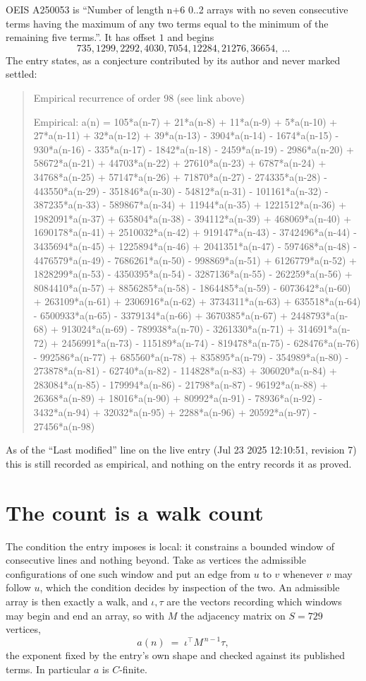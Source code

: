 \documentclass[11pt,a4paper]{article}
\theoremstyle{plain}
\theoremstyle{definition}
\begin{document}
OEIS A250053 is ``Number of length n+6 0..2 arrays with no seven consecutive terms having the maximum of any two terms equal to the minimum of the remaining five terms.''. It has offset $1$ and begins
\[
735, 1299, 2292, 4030, 7054, 12284, 21276, 36654,\ \dots
\]
The entry states, as a conjecture contributed by its author and never marked settled:
\begin{quote}\raggedright\small
Empirical recurrence of order 98 (see link above)

Empirical: a(n) = 105*a(n-7) + 21*a(n-8) + 11*a(n-9) + 5*a(n-10) + 27*a(n-11) + 32*a(n-12) + 39*a(n-13) - 3904*a(n-14) - 1674*a(n-15) - 930*a(n-16) - 335*a(n-17) - 1842*a(n-18) - 2459*a(n-19) - 2986*a(n-20) + 58672*a(n-21) + 44703*a(n-22) + 27610*a(n-23) + 6787*a(n-24) + 34768*a(n-25) + 57147*a(n-26) + 71870*a(n-27) - 274335*a(n-28) - 443550*a(n-29) - 351846*a(n-30) - 54812*a(n-31) - 101161*a(n-32) - 387235*a(n-33) - 589867*a(n-34) + 11944*a(n-35) + 1221512*a(n-36) + 1982091*a(n-37) + 635804*a(n-38) - 394112*a(n-39) + 468069*a(n-40) + 1690178*a(n-41) + 2510032*a(n-42) + 919147*a(n-43) - 3742496*a(n-44) - 3435694*a(n-45) + 1225894*a(n-46) + 2041351*a(n-47) - 597468*a(n-48) - 4476579*a(n-49) - 7686261*a(n-50) - 998869*a(n-51) + 6126779*a(n-52) + 1828299*a(n-53) - 4350395*a(n-54) - 3287136*a(n-55) - 262259*a(n-56) + 8084410*a(n-57) + 8856285*a(n-58) - 1864485*a(n-59) - 6073642*a(n-60) + 263109*a(n-61) + 2306916*a(n-62) + 3734311*a(n-63) + 635518*a(n-64) - 6500933*a(n-65) - 3379134*a(n-66) + 3670385*a(n-67) + 2448793*a(n-68) + 913024*a(n-69) - 789938*a(n-70) - 3261330*a(n-71) + 314691*a(n-72) + 2456991*a(n-73) - 115189*a(n-74) - 819478*a(n-75) - 628476*a(n-76) - 992586*a(n-77) + 685560*a(n-78) + 835895*a(n-79) - 354989*a(n-80) - 273878*a(n-81) - 62740*a(n-82) - 114828*a(n-83) + 306020*a(n-84) + 283084*a(n-85) - 179994*a(n-86) - 21798*a(n-87) - 96192*a(n-88) + 26368*a(n-89) + 18016*a(n-90) + 80992*a(n-91) - 78936*a(n-92) - 3432*a(n-94) + 32032*a(n-95) + 2288*a(n-96) + 20592*a(n-97) - 27456*a(n-98)
\end{quote}
As of the ``Last modified'' line on the live entry (Jul 23 2025 12:10:51, revision 7) this is still
recorded as empirical, and nothing on the entry records it as proved.

\section{The count is a walk count}

The condition the entry imposes is local: it constrains a bounded window of consecutive lines and nothing beyond. Take as vertices the admissible configurations of one such window and put an edge from $u$ to $v$ whenever $v$ may follow $u$, which the condition decides by inspection of the two.
An admissible array is then exactly a walk, and $\iota,\tau$ are the vectors recording which windows may begin and end an array, so with $M$ the adjacency matrix on $S=729$ vertices,
\[
a(n)\;=\;\iota^{\!\top}M^{\,n-1}\tau ,
\]
the exponent fixed by the entry's own shape and checked against its published terms. In
particular $a$ is $C$-finite.
\end{document}
